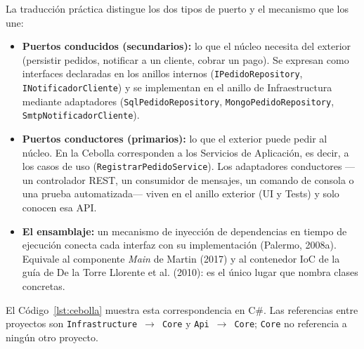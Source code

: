 \documentclass[11pt,a4paper]{article}
\begin{document}
La traducción práctica distingue los dos tipos de puerto y el mecanismo que los une:

\begin{itemize}[leftmargin=1.4em]
\item \textbf{Puertos conducidos (secundarios):} lo que el núcleo necesita del exterior
(persistir pedidos, notificar a un cliente, cobrar un pago). Se expresan como interfaces
declaradas en los anillos internos (\texttt{IPedidoRepository},
\texttt{INotificadorCliente}) y se implementan en el anillo de Infraestructura mediante
adaptadores (\texttt{SqlPedidoRepository}, \texttt{MongoPedidoRepository},
\texttt{SmtpNotificadorCliente}).
\item \textbf{Puertos conductores (primarios):} lo que el exterior puede pedir al núcleo. En la
Cebolla corresponden a los Servicios de Aplicación, es decir, a los casos de uso
(\texttt{RegistrarPedidoService}). Los adaptadores conductores ---un controlador REST, un
consumidor de mensajes, un comando de consola o una prueba automatizada--- viven en el anillo
exterior (UI y Tests) y solo conocen esa API.
\item \textbf{El ensamblaje:} un mecanismo de inyección de dependencias en tiempo de ejecución
conecta cada interfaz con su implementación (Palermo, 2008a). Equivale al componente
\emph{Main} de Martin (2017) y al contenedor IoC de la guía de De la Torre Llorente et al.
(2010): es el único lugar que nombra clases concretas.
\end{itemize}

El Código~\ref{lst:cebolla} muestra esta correspondencia en C\#. Las referencias entre
proyectos son \texttt{Infrastructure}~$\rightarrow$~\texttt{Core} y
\texttt{Api}~$\rightarrow$~\texttt{Core}; \texttt{Core} no referencia a ningún otro proyecto.
\end{document}
